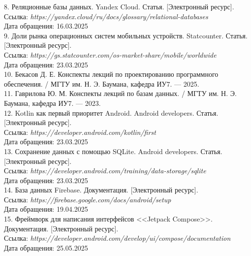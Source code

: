 \hspace{-1.25cm}
8. Реляционные базы данных. Yandex Cloud. Статья. [Электронный ресурс]. \\
Ссылка: \textit { https://yandex.cloud/ru/docs/glossary/relational-databases } \\
Дата обращения: 16.03.2025 \\

\hspace{-1.25cm}
9. Доли рынка операционных систем мобильных устройств. Statcounter. Статья. [Электронный ресурс]. \\
Ссылка: \textit { https://gs.statcounter.com/os-market-share/mobile/worldwide } \\
Дата обращения: 23.03.2025 \\

\hspace{-1.25cm}
10. Бекасов Д. Е. Конспекты лекций по проектированию программного обеспечения. / МГТУ им. Н. Э. Баумана, кафедра ИУ7. --- 2025. \\

\hspace{-1.25cm}
11. Гаврилова Ю. М. Конспекты лекций по базам данных. / МГТУ им. Н. Э. Баумана, кафедра ИУ7. --- 2023. \\

\hspace{-1.25cm}
12. Kotlin как первый приоритет Android. Android developers. Статья. [Электронный ресурс]. \\
Ссылка: \textit { https://developer.android.com/kotlin/first } \\
Дата обращения: 23.03.2025 \\

\hspace{-1.25cm}
13. Сохранение данных с помощью SQLite. Android developers. Статья. [Электронный ресурс]. \\
Ссылка: \textit { https://developer.android.com/training/data-storage/sqlite } \\
Дата обращения: 23.03.2025 \\

\hspace{-1.25cm}
14. База данных Firebase. Документация. [Электронный ресурс]. \\
Ссылка: \textit { https://firebase.google.com/docs/android/setup } \\
Дата обращения: 19.04.2025 \\

\hspace{-1.25cm}
15. Фреймворк для написания интерфейсов <<Jetpack Compose>>. Документация. [Электронный ресурс]. \\
Ссылка: \textit { https://developer.android.com/develop/ui/compose/documentation } \\
Дата обращения: 25.05.2025 \\

